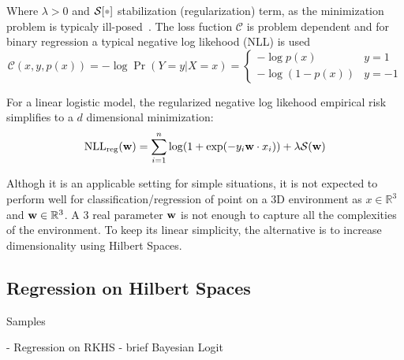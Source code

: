 Where $\lambda>0$ and $\mathcal{S}[\parm]$ stabilization (regularization) term,
as the minimization problem is typicaly
ill-posed~\cite{jaakkola1999probabilistic}. The loss fuction $\mathscr{C}$ is
problem dependent and for binary regression a typical negative log likehood
(NLL) is used
\begin{equation}
\mathscr{C}(x,y,p(x)) = - \log \Pr(Y=y|X=x) = 
\begin{cases} 
      - \log p(x) & y=1 \\
      - \log (1-p(x)) & y=-1
   \end{cases}
\end{equation}

For a linear logistic model, the regularized negative log likehood empirical
risk simplifies to a $d$ dimensional minimization:
\begin{equation}
\label{eq:classicnll}
\text{NLL}_{\text{reg}}(\mathrm{\mathbf{w}}) =  \sum_{i=1}^n \log(1+\exp(-y_i
\mathrm{\mathbf{w}}\cdot x_i)) +\lambda\mathcal{S}(\mathrm{\mathbf{w}})
\end{equation}

Althogh it is an applicable setting for simple situations, it is not expected to
perform well for classification/regression of point on a 3D environment as
$x\in\mathbb{R}^3$ and $\mathrm{\mathbf{w}}\in\mathbb{R}^3$. A 3 real parameter
$\mathrm{\mathbf{w}}$ is not enough to capture all the complexities of the environment. To
keep its linear simplicity, the alternative is to increase dimensionality using
Hilbert Spaces.

\subsection{Regression on Hilbert Spaces}

Samples 


\citet{preda2007regression} - Regression on RKHS
\citet{jaakkola1999probabilistic} - brief Bayesian Logit